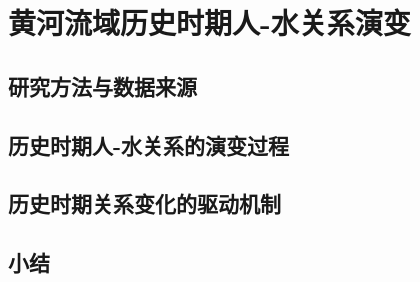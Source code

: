 \chapter{黄河流域历史时期人-水关系演变}\label{cha:3}


\section{研究方法与数据来源}\label{ch3:methods}



\section{历史时期人-水关系的演变过程}\label{ch3:process}


\section{历史时期关系变化的驱动机制}\label{ch3:mechanism}





\section{小结}\label{ch3:summary}

